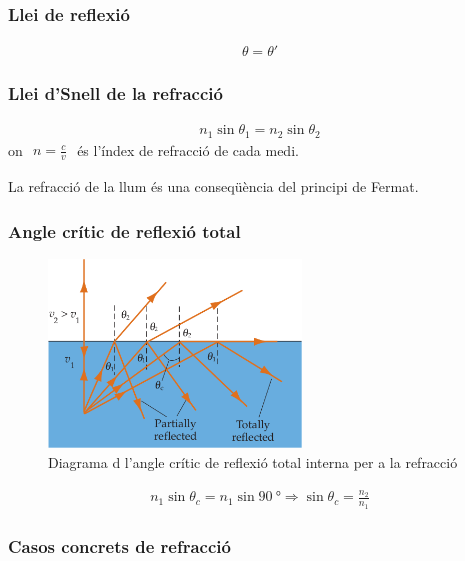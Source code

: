\subsubsection*{Llei de reflexió}
\begin{align}
    \boxed{\theta = \theta '}
\end{align}

\subsubsection*{Llei d'Snell de la refracció}
\begin{align}
    \boxed{n_{1} \sin \theta_{1} = n_{2} \sin \theta_{2}}
\end{align}
on $\begin{gathered} \boxed{n = \frac{c}{v}} \end{gathered}$ és l'índex de refracció de cada medi.

La refracció de la llum és una conseqüència del principi de Fermat.

\subsubsection*{Angle crític de reflexió total}
\begin{figure}[H]
\centering
    \includegraphics[width=0.6\textwidth]{images/3/33-angle-critic.png}
\caption{Diagrama d l'angle crític de reflexió total interna per a la refracció}
\end{figure}
\begin{align}
    n_{1} \sin \theta_{c} = n_{1} \sin \SI{90}{\degree} \Rightarrow \boxed{\sin \theta_{c} = \frac{n_{2}}{n_{1}}}
\end{align}

\subsubsection*{Casos concrets de refracció}

